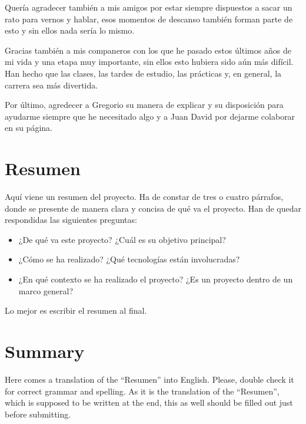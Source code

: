 \documentclass[a4paper, 12pt]{book}
\begin{document}
Quería agradecer también a mis amigos por estar siempre dispuestos a sacar un rato para vernos y hablar, esos momentos de descanso también forman parte de esto y sin ellos nada sería lo mismo.

Gracias también a mis companeros con los que he pasado estos últimos años de mi vida y una etapa muy importante, sin ellos esto hubiera sido aún más difícil. Han hecho que las clases, las tardes de estudio, las prácticas y, en general, la carrera sea más divertida.

Por último, agredecer a Gregorio su manera de explicar y su disposición para ayudarme siempre que he necesitado algo y a Juan David por dejarme colaborar en su página.



\chapter*{Resumen}

Aquí viene un resumen del proyecto.
Ha de constar de tres o cuatro párrafos, donde se presente de manera clara y concisa de qué va el proyecto. 
Han de quedar respondidas las siguientes preguntas:

\begin{itemize}
  \item ¿De qué va este proyecto? ¿Cuál es su objetivo principal?
  \item ¿Cómo se ha realizado? ¿Qué tecnologías están involucradas?
  \item ¿En qué contexto se ha realizado el proyecto? ¿Es un proyecto dentro de un marco general?
\end{itemize}

Lo mejor es escribir el resumen al final.


\chapter*{Summary}

Here comes a translation of the ``Resumen'' into English. 
Please, double check it for correct grammar and spelling.
As it is the translation of the ``Resumen'', which is supposed to be written at the end, this as well should be filled out just before submitting.
\end{document}
